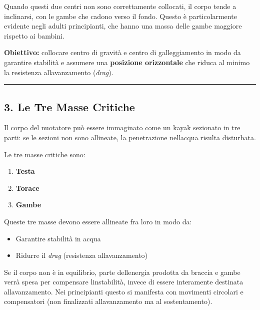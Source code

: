 \documentclass[a4paper,11pt]{article}
\providecommand{\tightlist}{%
  \setlength{\itemsep}{0pt}\setlength{\parskip}{0pt}}
\begin{document}
Quando questi due centri non sono correttamente collocati, il corpo
tende a inclinarsi, con le gambe che cadono verso il fondo. Questo è
particolarmente evidente negli adulti principianti, che hanno una massa
delle gambe maggiore rispetto ai bambini.

\textbf{Obiettivo:} collocare centro di gravità e centro di
galleggiamento in modo da garantire stabilità e assumere una
\textbf{posizione orizzontale} che riduca al minimo la resistenza
all\textquotesingle avanzamento (\emph{drag}).

\begin{center}\rule{0.5\linewidth}{0.5pt}\end{center}

\subsection{3. Le Tre Masse Critiche}\label{le-tre-masse-critiche}

Il corpo del nuotatore può essere immaginato come un kayak sezionato in
tre parti: se le sezioni non sono allineate, la penetrazione
nell\textquotesingle acqua risulta disturbata.

Le tre masse critiche sono:

\begin{enumerate}
      \tightlist
      \item
            \textbf{Testa}
      \item
            \textbf{Torace}
      \item
            \textbf{Gambe}
\end{enumerate}

Queste tre masse devono essere allineate fra loro in modo da:

\begin{itemize}
      \tightlist
      \item
            Garantire stabilità in acqua
      \item
            Ridurre il \emph{drag} (resistenza all\textquotesingle avanzamento)
\end{itemize}

Se il corpo non è in equilibrio, parte dell\textquotesingle energia
prodotta da braccia e gambe verrà spesa per compensare
l\textquotesingle instabilità, invece di essere interamente destinata
all\textquotesingle avanzamento. Nei principianti questo si manifesta
con movimenti circolari e compensatori (non finalizzati
all\textquotesingle avanzamento ma al sostentamento).
\end{document}
